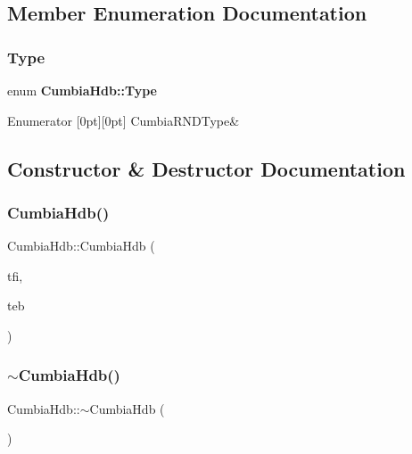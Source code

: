 \subsection{Member Enumeration Documentation}
\mbox{\label{classCumbiaHdb_a49b68e91f2ca8e80112779dd33af7fa7}} 
\subsubsection{Type}
{\footnotesize\ttfamily enum \textbf{ Cumbia\+Hdb\+::\+Type}}

\begin{DoxyEnumFields}{Enumerator}
[0pt][0pt]{}\mbox{\label{classCumbiaHdb_a49b68e91f2ca8e80112779dd33af7fa7a5659675198ab3faece964e2e6f31f161}} 
Cumbia\+R\+N\+D\+Type&\\
\hline

\end{DoxyEnumFields}


\subsection{Constructor \& Destructor Documentation}
\mbox{\label{classCumbiaHdb_ab19770d70c69c561057a5748a44c3106}} 
\subsubsection{CumbiaHdb()}
{\footnotesize\ttfamily Cumbia\+Hdb\+::\+Cumbia\+Hdb (\begin{DoxyParamCaption}\item[{Cu\+Thread\+Factory\+ImplI $\ast$}]{tfi,  }\item[{Cu\+Threads\+Event\+Bridge\+Factory\+\_\+I $\ast$}]{teb }\end{DoxyParamCaption})}

\mbox{\label{classCumbiaHdb_a02949e73d730b09b443a6a8d50cee71a}} 
\subsubsection{$\sim$CumbiaHdb()}
{\footnotesize\ttfamily Cumbia\+Hdb\+::$\sim$\+Cumbia\+Hdb (\begin{DoxyParamCaption}{ }\end{DoxyParamCaption})}



